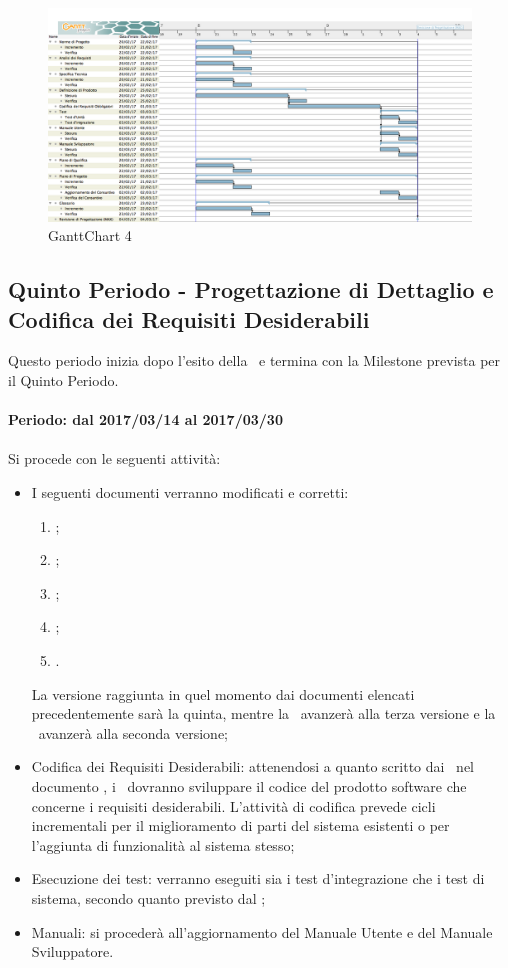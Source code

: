 \documentclass[../PianoDiProgetto.tex]{subfiles}
\begin{document}
	\newpage
	\begin{figure}[!h]
		\centering
		\includegraphics[width=\textwidth]{Pianificazione/Immagini/GanttChart04.png}
		\caption{GanttChart 4}
	\end{figure}	
	
	\newpage
	\subsection{Quinto Periodo - Progettazione di Dettaglio e Codifica dei Requisiti Desiderabili}
	Questo periodo inizia dopo l'esito della \revisionediprogettazione\ e termina con la Milestone prevista per il Quinto Periodo.
	\\
	\\
	\textbf{Periodo: dal 2017/03/14 al 2017/03/30}
	\\
	\\
	Si procede con le seguenti attività:
	\begin{itemize}
		\item I seguenti documenti verranno modificati e corretti:
			\begin{enumerate}
				\item \normediprogetto;
				\item \analisideirequisiti;
				\item \pianodiqualifica;
				\item \pianodiprogetto;
				\item \glossario.
			\end{enumerate}
		La versione raggiunta in quel momento dai documenti elencati precedentemente sarà la quinta, mentre la \specificatecnica\ avanzerà alla terza versione e la \ avanzerà alla seconda versione;
		\item Codifica dei Requisiti Desiderabili: attenendosi a quanto scritto dai \progettisti\ nel documento , i \programmatori\ dovranno sviluppare il codice del prodotto software che concerne i requisiti desiderabili. L'attività di codifica prevede cicli incrementali per il miglioramento di parti del sistema esistenti o per l'aggiunta di funzionalità al sistema stesso;
		\item Esecuzione dei test: verranno eseguiti sia i test d'integrazione che i test di sistema, secondo quanto previsto dal \pianodiqualifica;
		\item Manuali: si procederà all'aggiornamento del Manuale Utente e del Manuale Sviluppatore.
	\end{itemize}
	
\end{document}

